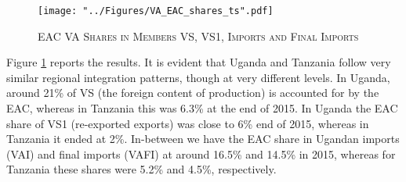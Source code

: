 \documentclass[a4paper]{article}
\begin{document}
%
%
%
%
%

\begin{figure}[h!]
\centering
\caption{\label{fig:VAEACshares}\textsc{EAC VA Shares in Members VS, VS1, Imports and Final Imports}}
\texttt{[image: "../Figures/VA\_EAC\_shares\_ts".pdf]} %
\end{figure}
\FloatBarrier

Figure \ref{fig:VAEACshares} reports the results. It is evident that Uganda and Tanzania follow very similar regional integration patterns, though at very different levels. In Uganda, around 21\% of VS (the foreign content of production) is accounted for by the EAC, whereas in Tanzania this was 6.3\% at the end of 2015. In Uganda the EAC share of VS1 (re-exported exports) was close to 6\% end of 2015, whereas in Tanzania it ended at 2\%. In-between we have the EAC share in Ugandan imports (VAI) and final imports (VAFI) at around 16.5\% and 14.5\% in 2015, whereas for Tanzania these shares were 5.2\% and 4.5\%, respectively. \newline

\end{document}
